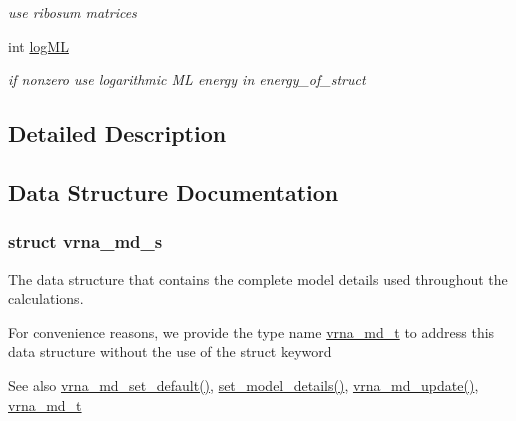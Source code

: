 \begin{DoxyCompactItemize}
\begin{DoxyCompactList}\small\item\em use ribosum matrices \end{DoxyCompactList}\item 
\hypertarget{group__model__details_ga80c3c5fd35e7479704cc91d2d0367743}{}int \hyperlink{group__model__details_ga80c3c5fd35e7479704cc91d2d0367743}{log\+M\+L}\label{group__model__details_ga80c3c5fd35e7479704cc91d2d0367743}

\begin{DoxyCompactList}\small\item\em if nonzero use logarithmic M\+L energy in energy\+\_\+of\+\_\+struct \end{DoxyCompactList}\end{DoxyCompactItemize}


\subsection{Detailed Description}


\subsection{Data Structure Documentation}
\label{structvrna__md__s}
\hypertarget{group__model__details_structvrna__md__s}{}
\subsubsection{struct vrna\+\_\+md\+\_\+s}
The data structure that contains the complete model details used throughout the calculations. 

For convenience reasons, we provide the type name \hyperlink{group__model__details_ga1f8a10e12a0a1915f2a4eff0b28ea17c}{vrna\+\_\+md\+\_\+t} to address this data structure without the use of the struct keyword

\begin{DoxySeeAlso}{See also}
\hyperlink{group__model__details_ga8ac6ff84936282436f822644bf841f66}{vrna\+\_\+md\+\_\+set\+\_\+default()}, \hyperlink{group__model__details_gabad896c3650d420f3f3ddefc69e2bceb}{set\+\_\+model\+\_\+details()}, \hyperlink{group__model__details_ga36ae40b8c3b82362f5798ad5b047b814}{vrna\+\_\+md\+\_\+update()}, \hyperlink{group__model__details_ga1f8a10e12a0a1915f2a4eff0b28ea17c}{vrna\+\_\+md\+\_\+t} 
\end{DoxySeeAlso}
